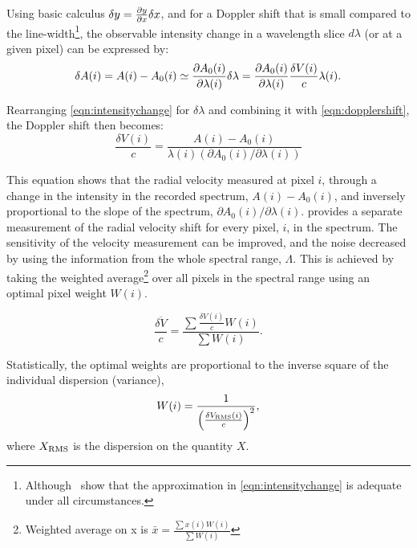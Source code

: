 
Using basic calculus \(\delta y = \frac{\partial{y}}{\partial{x}} \delta x \nonumber\), and for a Doppler shift that is small compared to the line-width\footnote{Although~\citet{connes_absolute_1985} show that the approximation in \cref{eqn:intensitychange} is adequate under all circumstances.}, the observable intensity change in a wavelength slice \(d \lambda\) (or at a given pixel) can be expressed by:
\begin{equation}
\delta A(i) = A(i) - {A}_{0}(i) \simeq \frac{\partial{{A}_{0}(i)}}{\partial{\lambda(i)}} \delta \lambda = \frac{\partial{{A}_{0}(i)}}{\partial{\lambda(i)}} \frac{\delta V(i)}{c}\lambda(i).
\label{eqn:intensitychange}
\end{equation}

Rearranging \cref{eqn:intensitychange} for \(\delta \lambda\) and combining it with \cref{eqn:dopplershift}, the Doppler shift then becomes:
\begin{equation}
\frac{\delta V(i)}{c} = \frac{A(i) - {A}_{0}(i) }{\lambda(i) (\partial {A}_{0}(i)/\partial \lambda(i))} \label{eqn:delta_v_i}
\end{equation}

This equation shows that the radial velocity measured at pixel {\(i\)}, through a change in the intensity in the recorded spectrum, \(A(i)-{A}_{0}(i)\), and inversely proportional to the slope of the spectrum, \({\partial {A}_{0}(i)}/{\partial \lambda(i)}\).
 provides a separate measurement of the radial velocity shift for every pixel, \(i\), in the spectrum.
The sensitivity of the velocity measurement can be improved, and the noise decreased by using the information from the whole spectral range, \(\Lambda\).
This is achieved by taking the weighted average\footnote{Weighted average on x is \(\bar{x} = \frac{\sum{ x(i)W(i)}}{\sum {W(i)}}\)} over all pixels in the spectral range using an optimal pixel weight \(W(i)\).

\begin{equation}
\overline{\frac{\delta V}{c}} = \frac{\sum{\frac{\delta V(i)}{c}W(i)}}{\sum {W(i)}}.
\end{equation}

Statistically, the optimal weights are proportional to the inverse square of the individual dispersion (variance),
\begin{equation}
W(i) = \frac{1}{{\left(\frac{\delta V_{\textrm{RMS}}(i)}{c}\right)}^{2}}, \label{eqn:weights}
\end{equation}
where \(X_{\textrm{RMS}}\) is the dispersion on the quantity \(X\).

